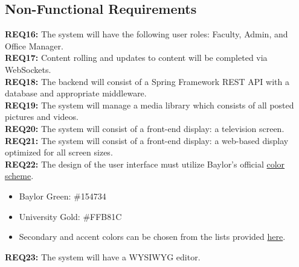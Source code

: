 \documentclass{article}
\begin{document}
\subsection{Non-Functional Requirements}
\textbf{REQ16:} The system will have the following user roles: Faculty, Admin, and Office Manager. \\
\textbf{REQ17:} Content rolling and updates to content will be completed via WebSockets. \\
\textbf{REQ18:} The backend will consist of a Spring Framework REST API with a database and appropriate middleware. \\
\textbf{REQ19:} The system will manage a media library which consists of all posted pictures and videos. \\
\textbf{REQ20:} The system will consist of a front-end display: a television screen. \\
\textbf{REQ21:} The system will consist of a front-end display: a web-based display optimized for all screen sizes. \\
\textbf{REQ22:} The design of the user interface must utilize Baylor's official \href{https://brand.web.baylor.edu/brand-standards/official-brand-colors}{color scheme}.
\begin{itemize}
    \item Baylor Green: \#154734
    \item University Gold: \#FFB81C
    \item Secondary and accent colors can be chosen from the lists provided \href{https://brand.web.baylor.edu/brand-guidelines/design-colors}{here}.
\end{itemize}
\textbf{REQ23:} The system will have a WYSIWYG editor.
\end{document}

